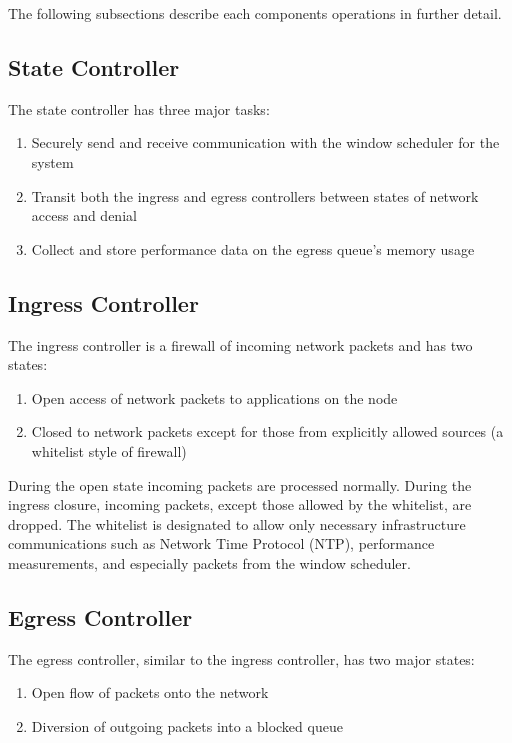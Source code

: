 \documentclass{llncs}
\begin{document}
The following subsections describe each components operations in further detail. 
\subsection{State Controller}
The state controller has three major tasks:
\begin{enumerate} \itemsep1pt \parskip0pt 
\item Securely send and receive communication with the window scheduler for the system
\item Transit both the ingress and egress controllers between states of network access and denial
\item Collect and store performance data on the egress queue's memory usage
\end{enumerate}

 

\subsection{Ingress Controller}
The ingress controller is a firewall of incoming network packets and has two states:
\begin{enumerate} \itemsep1pt \parskip0pt 
\item Open access of network packets to applications on the node
\item Closed to network packets except for those from explicitly allowed sources (a whitelist style of firewall)
\end{enumerate}


During the open state incoming packets are processed normally. During the ingress closure, incoming packets, except those allowed by the whitelist, are dropped. The whitelist is designated to allow only necessary infrastructure communications such as Network Time Protocol (NTP), performance measurements, and especially packets from the window scheduler.
\subsection{Egress Controller}
The egress controller, similar to the ingress controller, has two major states:
\begin{enumerate} \itemsep1pt \parskip0pt 
\item Open flow of packets onto the network
\item Diversion of outgoing packets into a blocked queue
\end{enumerate}
\end{document}
